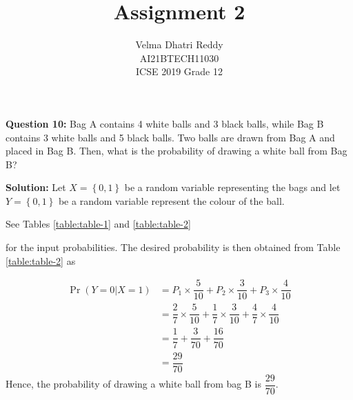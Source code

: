 \documentclass[journal,11pt,twocolumn]{IEEEtran}
\title{Assignment 2}
\author{Velma Dhatri Reddy \\ \normalsize AI21BTECH11030 \\ \vspace*{10pt} \Large ICSE 2019 Grade 12}
\providecommand{\pr}[1]{\ensuremath{\Pr\left(#1\right)}}
\providecommand{\cbrak}[1]{\ensuremath{\left\{#1\right\}}}
\begin{document}
\maketitle
\textbf{Question 10:}
Bag A contains 4 white balls and 3 black balls, while Bag B contains 3 white balls and 5 black balls. Two balls are drawn from Bag A and placed in Bag B. Then, what is the probability of drawing a white ball from Bag B?

\textbf{Solution:} Let $X=\cbrak{0,1}$ be a random variable representing the bags and let $Y=\cbrak{0,1}$ be a random variable represent the colour of the ball.

See Tables 
	\eqref{table:table-1}
	and 
	\eqref{table:table-2} 
\begin{table}[ht!]
	
	\vspace*{5pt}
\caption{}
	\label{table:table-1}
\end{table}
\begin{table}[ht!]
	
	\vspace*{5pt}
\caption{}
	\label{table:table-2}
\end{table}
for the input probabilities.
The desired probability is then obtained from Table \eqref{table:table-2} as

\begin{align}
    \pr{Y=0|X=1} &= P_1\times\dfrac{5}{10} + P_2\times\dfrac{3}{10}+ P_3\times\dfrac{4}{10}\\
    &= \dfrac{2}{7}\times\dfrac{5}{10} + \dfrac{1}{7}\times\dfrac{3}{10} + \dfrac{4}{7}\times\dfrac{4}{10}\\
    &= \dfrac{1}{7} + \dfrac{3}{70} + \dfrac{16}{70}\\
    &= \dfrac{29}{70}
\end{align}
Hence, the probability of drawing a white ball from bag B is $\dfrac{29}{70}$.
\end{document}
